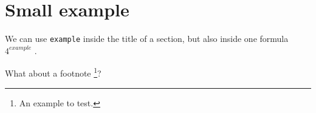 \documentclass[12pt]{article}
\begin{document}
\section{Small example}

We can use \verb#example# inside the title of a section,
but also inside one formula $4^{example}$ .

What about a footnote
\footnote{
	An example to test.
}? 
\end{document}
